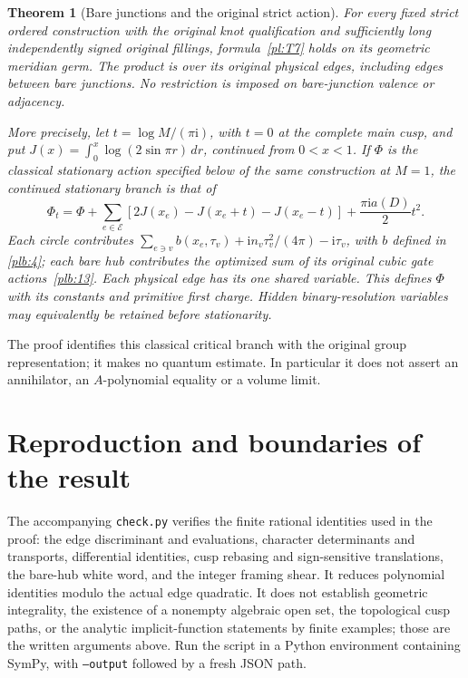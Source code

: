 \documentclass[11pt]{article}
\numberwithin{equation}{section}
\newtheorem{theorem}{Theorem}[section]
\theoremstyle{definition}\newtheorem{definition}[theorem]{Definition}
\theoremstyle{remark}\newtheorem{remark}[theorem]{Remark}
\newcommand{\ii}{\mathrm i}
\begin{document}
\begin{theorem}[Bare junctions and the original strict action]\label{pl:strict-longitude}
For every fixed strict ordered construction with the original knot qualification and sufficiently long independently signed original fillings, formula~\eqref{pl:T7} holds on its geometric meridian germ. The product is over its original physical edges, including edges between bare junctions. No restriction is imposed on bare-junction valence or adjacency.

More precisely, let $t=\log M/(\pi\ii)$, with $t=0$ at the
complete main cusp, and put
$J(x)=\int_0^x\log(2\sin\pi r)\,dr$, continued from $0<x<1$. If $\Phi$ is the classical stationary action specified below of the same construction at $M=1$, the continued stationary branch is that of
\begin{equation}\label{pl:deformed-action}
 \Phi_t=\Phi+\sum_{e\in\mathcal E}
 [2J(x_e)-J(x_e+t)-J(x_e-t)]+\frac{\pi\ii a(D)}2t^2.
\end{equation}
Each circle contributes $\sum_{e\ni v}b(x_e,\tau_v)+\ii n_v\tau_v^2/(4\pi)-\ii\tau_v$, with $b$ defined in \eqref{plb:4}; each bare hub contributes the optimized sum of its original cubic gate actions~\eqref{plb:13}. Each physical edge has its one shared variable. This defines $\Phi$ with its constants and primitive first charge. Hidden binary-resolution variables may equivalently be retained before stationarity.
\end{theorem}
The proof identifies this classical critical branch with the original group representation; it makes no quantum estimate. In particular it does not assert an annihilator, an $A$-polynomial equality or a volume limit.








\section{Reproduction and boundaries of the result}\label{pl:checks}
The accompanying \texttt{check.py} verifies the finite rational identities used in the proof: the edge discriminant and evaluations, character determinants and transports, differential identities, cusp rebasing and sign-sensitive translations, the bare-hub white word, and the integer framing shear. It reduces polynomial identities modulo the actual edge quadratic. It does not establish geometric integrality, the existence of a nonempty algebraic open set, the topological cusp paths, or the analytic implicit-function statements by finite examples; those are the written arguments above. Run the script in a Python environment containing SymPy, with \texttt{--output} followed by a fresh JSON path.
\end{document}
